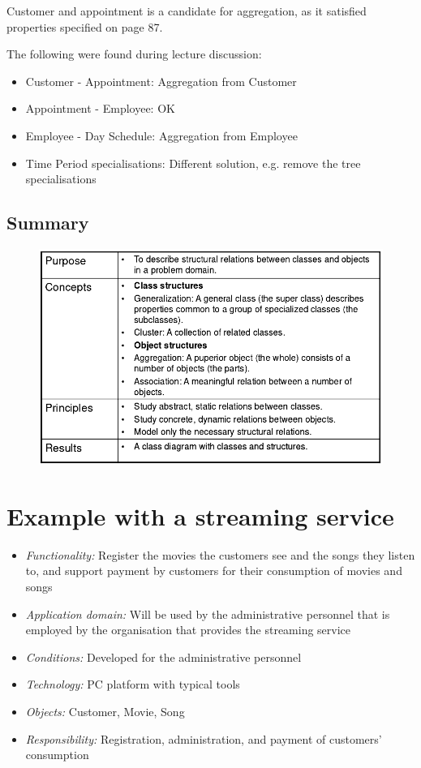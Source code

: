 Customer and appointment is a candidate for aggregation, as it satisfied properties specified on page 87.

\noindent The following were found during lecture discussion:
\begin{itemize}
    \item Customer - Appointment: Aggregation from Customer
    \item Appointment - Employee: OK
    \item Employee - Day Schedule: Aggregation from Employee
    \item Time Period specialisations: Different solution, e.g. remove the tree specialisations
\end{itemize}

\subsection{Summary}
\begin{figure}[H]
    \centering
    \includegraphics[scale=2]{figures/structuresummary.png}
\end{figure}

\section{Example with a streaming service}\label{structure:streamingservice}
\begin{itemize}
    \item[] \textit{Functionality:} Register the movies the customers see and the songs they listen to, and support payment by customers for their consumption of movies and songs
    \item[] \textit{Application domain:} Will be used by the administrative personnel that is employed by the organisation that provides the streaming service
    \item[] \textit{Conditions:} Developed for the administrative personnel
    \item[] \textit{Technology:} PC platform with typical tools
    \item[] \textit{Objects:} Customer, Movie, Song
    \item[] \textit{Responsibility:} Registration, administration, and payment of customers' consumption
\end{itemize}

